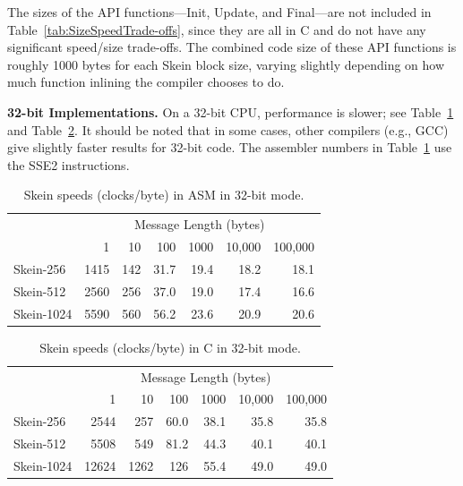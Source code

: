 \documentclass[11pt,twoside]{article}
\begin{document}
The sizes of the API functions---Init, Update, and Final---are not included in Table~\ref{tab:SizeSpeedTrade-offs}, since they are all in C and do not have any significant speed/size trade-offs. The combined code size of these API functions is roughly 1000 bytes for each Skein block size, varying slightly depending on how much function inlining the compiler chooses to do.

{\bf 32-bit Implementations.}  
On a 32-bit CPU, performance is slower; see
Table~\ref{tab:SkeinASM32Speed} and Table~\ref{tab:SkeinC32Speed}.
It should be noted that in some cases, other compilers (e.g., GCC)
give slightly faster results for 32-bit code. The assembler numbers
in Table~\ref{tab:SkeinASM32Speed} use the SSE2 instructions.
%
\begin{table}[htb]
  \begin{center}
    \begin{tabular}{|l|rrrrrr|}
    \hline
    & \multicolumn{6}{c|}{Message Length (bytes)}\\
               &     1 &   10 &  100 & 1000 & 10,000 & 100,000 \\
    \hline
    Skein-256  &  1415 &  142 & 31.7 & 19.4 &   18.2 & 18.1 \\
    Skein-512  &  2560 &  256 & 37.0 & 19.0 &   17.4 & 16.6 \\
    Skein-1024 &  5590 &  560 & 56.2 & 23.6 &   20.9 & 20.6 \\
    \hline
    \end{tabular}
   \end{center}\caption{Skein speeds (clocks/byte) in ASM in 32-bit mode.}
  \label{tab:SkeinASM32Speed}
\end{table}
%

%
\begin{table}[htb]
  \begin{center}
    \begin{tabular}{|l|rrrrrr|}
    \hline
    & \multicolumn{6}{c|}{Message Length (bytes)}\\
               &    1  &   10 &  100 & 1000 & 10,000 & 100,000 \\
    \hline
    Skein-256  &  2544 &  257 & 60.0 & 38.1 &   35.8 & 35.8 \\
    Skein-512  &  5508 &  549 & 81.2 & 44.3 &   40.1 & 40.1 \\
    Skein-1024 & 12624 & 1262 & 126  & 55.4 &   49.0 & 49.0 \\
    \hline
    \end{tabular}
   \end{center}\caption{Skein speeds (clocks/byte) in C in 32-bit mode.}
  \label{tab:SkeinC32Speed}
\end{table}
%
\end{document}
